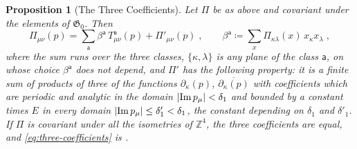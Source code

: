 \documentclass[11pt]{preprint}
\DeclarePairedDelimiter{\abs}{\lvert}{\rvert}
\numberwithin{equation}{section}
\newtheorem{proposition}[theorem]{Proposition}
\theoremstyle{definition}
\theoremstyle{remark}
\theoremstyle{plain}
\begin{document}
\begin{proposition}[The Three Coefficients]\label{prop:three-coefficients}
Let $\Pi$ be as above and covariant under the elements of $\mathfrak G_0$. Then
\begin{equation}\label{eq:three-coefficients}
    \Pi_{\mu\nu}(p) = \sum_{\mathsf a}\beta^{\mathsf a}\,T^{\mathsf a}_{\mu\nu}(p) + \Pi'_{\mu\nu}(p)\;,
    \qquad
    \beta^{\mathsf a} \coloneqq \sum_x\Pi_{\kappa\lambda}(x)\,x_\kappa x_\lambda\;,
\end{equation}
where the sum runs over the three classes, $\{ \kappa, \lambda \}$ is any plane of the class $\mathsf a$, on whose choice $\beta^{\mathsf a}$ does not depend, and $\Pi'$ has the following property: it is a finite sum of products of three of the functions $\partial_\kappa(p)$, $\overline{\partial_\kappa(p)}$ with coefficients which are periodic and analytic in the domain $\abs{\operatorname{Im}p_\mu} < \delta_1$ and bounded by a constant times $E$ in every domain $\abs{\operatorname{Im}p_\mu} \leq \delta'_1 < \delta_1$, the constant depending on $\delta_1$ and $\delta'_1$. If $\Pi$ is covariant under all the isometries of $\mathbb Z^4$, the three coefficients are equal, and \eqref{eq:three-coefficients} is \cite[(5.37), (5.38)]{BalabanRG1}.
\end{proposition}
\end{document}
